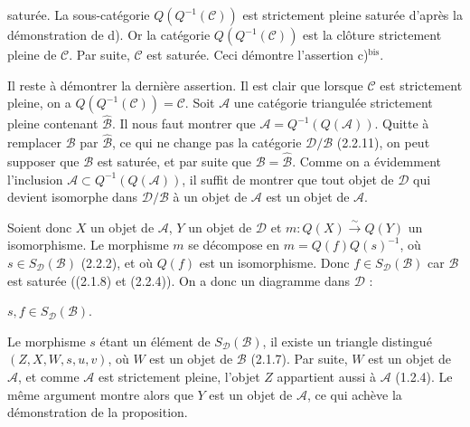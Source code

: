 \clearpage
{}%
\begingroup
\small
\setlength{\parskip}{0pt}%
\setlength{\emergencystretch}{1.5em}%
\setlength{\abovedisplayskip}{3pt plus 1pt minus 1pt}%
\setlength{\belowdisplayskip}{3pt plus 1pt minus 1pt}%

\noindent saturée. La sous-catégorie $Q(Q^{-1}(\mathcal C))$ est strictement
pleine saturée d'après la démonstration de d). Or la catégorie
$Q(Q^{-1}(\mathcal C))$ est la clôture strictement pleine de $\mathcal C$.
Par suite, $\mathcal C$ est saturée. Ceci démontre l'assertion
c)$^{\mathrm{bis}}$.

Il reste à démontrer la dernière assertion. Il est clair que lorsque
$\mathcal C$ est strictement pleine, on a $Q(Q^{-1}(\mathcal C))=\mathcal C$.
Soit $\mathcal A$ une catégorie triangulée strictement pleine contenant
$\widehat{\mathcal B}$. Il nous faut montrer que
$\mathcal A=Q^{-1}(Q(\mathcal A))$. Quitte à remplacer $\mathcal B$ par
$\widehat{\mathcal B}$, ce qui ne change pas la catégorie
$\mathcal D/\mathcal B$ (2.2.11), on peut supposer que $\mathcal B$ est
saturée, et par suite que $\mathcal B=\widehat{\mathcal B}$. Comme on a
évidemment l'inclusion
$\mathcal A\subset Q^{-1}(Q(\mathcal A))$, il suffit de montrer que tout
objet de $\mathcal D$ qui devient isomorphe dans $\mathcal D/\mathcal B$ à
un objet de $\mathcal A$ est un objet de $\mathcal A$.

Soient donc $X$ un objet de $\mathcal A$, $Y$ un objet de $\mathcal D$ et
$m\colon Q(X)\xrightarrow{\sim}Q(Y)$ un isomorphisme. Le morphisme $m$ se
décompose en $m=Q(f)Q(s)^{-1}$, où
$s\in S_{\mathcal D}(\mathcal B)$ (2.2.2), et où $Q(f)$ est un
isomorphisme. Donc $f\in S_{\mathcal D}(\mathcal B)$ car $\mathcal B$ est
saturée ((2.1.8) et (2.2.4)). On a donc un diagramme dans $\mathcal D$ :

\begin{center}
  \qquad $s,f\in S_{\mathcal D}(\mathcal B)$\quad .
\end{center}

Le morphisme $s$ étant un élément de $S_{\mathcal D}(\mathcal B)$, il
existe un triangle distingué $(Z,X,W,s,u,v)$, où $W$ est un objet de
$\mathcal B$ (2.1.7). Par suite, $W$ est un objet de $\mathcal A$, et comme
$\mathcal A$ est strictement pleine, l'objet $Z$ appartient aussi à
$\mathcal A$ (1.2.4). Le même argument montre alors que $Y$ est un objet de
$\mathcal A$, ce qui achève la démonstration de la proposition.

